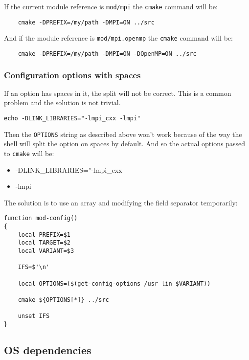 \documentclass[a4paper,12pt,twoside]{article}
\newcommand{\code}[1]{\texttt{#1}}
\begin{document}
If the current module reference is \code{mod/mpi} the \code{cmake} command will be:

\begin{lstlisting}
	cmake -DPREFIX=/my/path -DMPI=ON ../src
\end{lstlisting}

And if the module reference is \code{mod/mpi.openmp} the \code{cmake} command will be:

\begin{lstlisting}
	cmake -DPREFIX=/my/path -DMPI=ON -DOpenMP=ON ../src
\end{lstlisting}

\subsubsection{Configuration options with spaces}
\label{config options spaces}

If an option has spaces in it, the split will not be correct. This is a common problem and the solution is not trivial.

\code{echo -DLINK\_LIBRARIES="-lmpi\_cxx -lmpi"}

Then the \code{OPTIONS} string as described above won't work because of the way the shell will split the option on spaces by default. And so the actual options passed to \code{cmake} will be:

\begin{itemize}
	\item -DLINK\_LIBRARIES="-lmpi\_cxx
	\item -lmpi
\end{itemize}

The solution is to use an array and modifying the field separator temporarily:

\begin{lstlisting}
function mod-config()
{
	local PREFIX=$1
	local TARGET=$2
	local VARIANT=$3

	IFS=$'\n'

	local OPTIONS=($(get-config-options /usr lin $VARIANT))

	cmake ${OPTIONS[*]} ../src

	unset IFS
}
\end{lstlisting}

\subsection{OS dependencies}
\label{OS dependencies}
\end{document}
